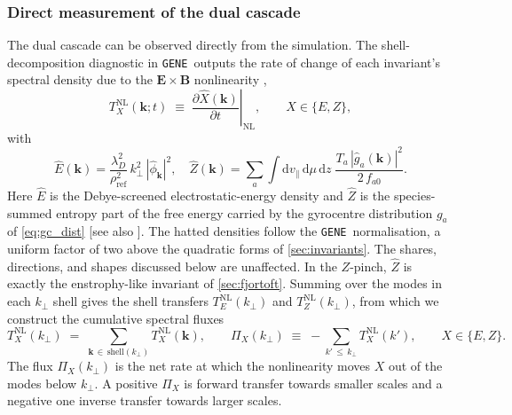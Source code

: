 \documentclass{jpp}
\newcommand{\rmd}{\text{d}}
\renewcommand{\vec}[1]{\boldsymbol{#1}}
\newcommand{\vec}[1]{\boldsymbol{#1}}
\newcommand{\kperp}{k_\perp}
\newcommand{\lambdaD}{\lambda_D}
\newcommand{\gene}{\texttt{GENE}}
\begin{document}
\subsubsection{Direct measurement of the dual cascade}\label{sec:direct_cascade_flux}

The dual cascade can be observed directly from the simulation. The shell-decomposition diagnostic in \gene\ outputs the rate of change of each invariant's spectral density due to the $\vec{E} \times \vec{B}$ nonlinearity \citep{BanonNavarro2011, BanonNavarro2016},
\begin{equation}\label{eq:T_def}
T_X^\mathrm{NL}(\vec{k}; t) \;\equiv\; \left.\frac{\partial \hat X(\vec{k})}{\partial t}\right|_{\mathrm{NL}}, \qquad X \in \{E, Z\},
\end{equation}
with
\begin{equation}\label{eq:GK_W_E_defs}
\hat E(\vec k) = \frac{\lambdaD^2}{\rho_\mathrm{ref}^2}\, \kperp^2\, |\hat\phi_{\vec k}|^2 ,
\quad
\hat Z(\vec k) = \sum_a \int \rmd v_\parallel\, \rmd\mu\, \rmd z\; \frac{T_a\, |\hat g_a(\vec k)|^2}{2\, f_{a0}} .
\end{equation}
Here $\hat E$ is the Debye-screened electrostatic-energy density and $\hat Z$ is the species-summed entropy part of the free energy carried by the gyrocentre distribution $g_a$ of \cref{eq:gc_dist} [see also \cite{Schekochihin2008}]. The hatted densities follow the \gene\ normalisation, a uniform factor of two above the quadratic forms of \cref{sec:invariants}. The shares, directions, and shapes discussed below are unaffected. In the $Z$-pinch, $\hat Z$ is exactly the enstrophy-like invariant of \cref{sec:fjortoft}. Summing over the modes in each $\kperp$ shell gives the shell transfers $T_E^\mathrm{NL}(\kperp)$ and $T_Z^\mathrm{NL}(\kperp)$, from which we construct the cumulative spectral fluxes
\begin{equation}\label{eq:Pi_def}
T_X^\mathrm{NL}(\kperp) \;=\; \sum_{\vec k \,\in\, \mathrm{shell}(\kperp)} T_X^\mathrm{NL}(\vec k),
\qquad
\Pi_X(\kperp) \;\equiv\; -\!\!\sum_{k' \,\le\, \kperp} T_X^\mathrm{NL}(k') ,
\qquad X \in \{E, Z\}.
\end{equation}
The flux $\Pi_X(\kperp)$ is the net rate at which the nonlinearity moves $X$ out of the modes below $\kperp$. A positive $\Pi_X$ is forward transfer towards smaller scales and a negative one inverse transfer towards larger scales.
\end{document}
